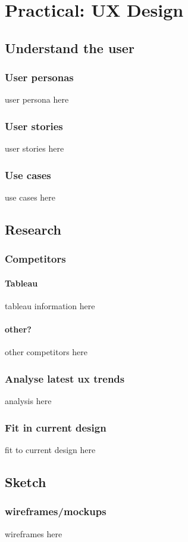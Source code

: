 \chapter{Practical: UX Design}

\section{Understand the user}
    \subsection{User personas}
        user persona here
    \subsection{User stories}
        user stories here
    \subsection{Use cases}
        use cases here

\section{Research}
    \subsection{Competitors}
        \subsubsection{Tableau}
        tableau information here
        \subsubsection{other?}
        other competitors here
    \subsection{Analyse latest ux trends}
    analysis here
    \subsection{Fit in current design}
    fit to current design here
    
\section{Sketch}
    \subsection{wireframes/mockups}
    wireframes here
